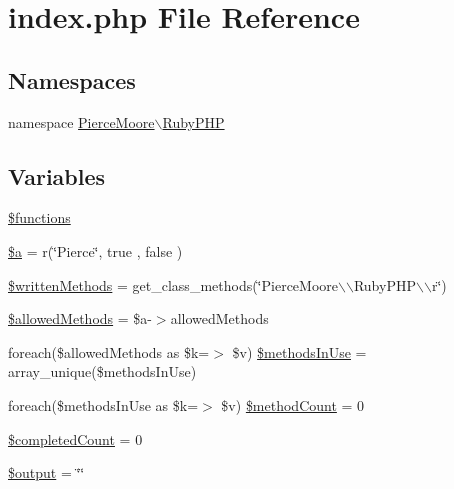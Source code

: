 \hypertarget{index_8php}{\section{index.\-php File Reference}
\label{index_8php}
}
\subsection*{Namespaces}
\begin{DoxyCompactItemize}
\item 
namespace \hyperlink{namespace_pierce_moore_1_1_ruby_p_h_p}{Pierce\-Moore$\backslash$\-Ruby\-P\-H\-P}
\end{DoxyCompactItemize}
\subsection*{Variables}
\begin{DoxyCompactItemize}
\item 
\hyperlink{namespace_pierce_moore_1_1_ruby_p_h_p_aa75daea491817f3b64daa2f51128bcdf}{\$functions}
\item 
\hyperlink{namespace_pierce_moore_1_1_ruby_p_h_p_acebf83966ef6d7e5645a6b62ba368f9f}{\$a} = r(\char`\"{}Pierce\char`\"{}, true , false )
\item 
\hyperlink{namespace_pierce_moore_1_1_ruby_p_h_p_a2e64f0494f7eccf90168af7f67198650}{\$written\-Methods} = get\-\_\-class\-\_\-methods(\char`\"{}Pierce\-Moore$\backslash$$\backslash$\-Ruby\-P\-H\-P$\backslash$$\backslash$r\char`\"{})
\item 
\hyperlink{namespace_pierce_moore_1_1_ruby_p_h_p_ab278eba7cab5341dacdccecd7a2cc2df}{\$allowed\-Methods} = \$a-\/$>$allowed\-Methods
\item 
foreach(\$allowed\-Methods as \$k=$>$ \$v) \hyperlink{namespace_pierce_moore_1_1_ruby_p_h_p_a1c475c0c53206fb15c4c3028bb7d5c7c}{\$methods\-In\-Use} = array\-\_\-unique(\$methods\-In\-Use)
\item 
foreach(\$methods\-In\-Use as \$k=$>$ \$v) \hyperlink{namespace_pierce_moore_1_1_ruby_p_h_p_a56c1b7384519355df73a254a12f0bae3}{\$method\-Count} = 0
\item 
\hyperlink{namespace_pierce_moore_1_1_ruby_p_h_p_a51c734a41c7747051953ec3d78dd1c5b}{\$completed\-Count} = 0
\item 
\hyperlink{namespace_pierce_moore_1_1_ruby_p_h_p_a3b3e916294d02621688f0b1b64f95628}{\$output} = \char`\"{}\char`\"{}
\end{DoxyCompactItemize}
